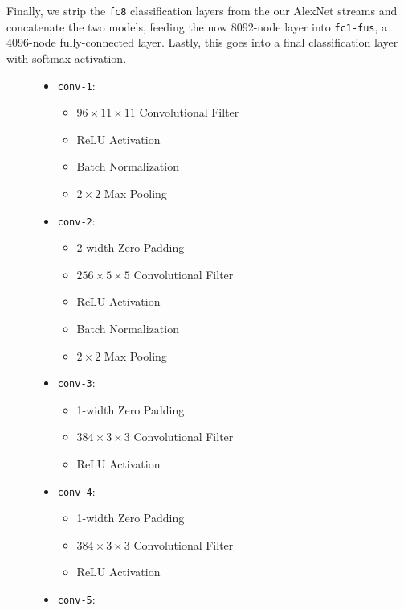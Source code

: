 Finally, we strip the \texttt{fc8} classification layers from the our AlexNet streams and concatenate the two models, feeding the now 8092-node layer into \texttt{fc1-fus}, a 4096-node fully-connected layer. Lastly, this goes into a final classification layer with softmax activation.




\begin{figure}
\begin{mdframed}
\begin{itemize}
    \item \texttt{conv-1}:
    \begin{itemize}
        \item $96 \times 11 \times 11$ Convolutional Filter
        \item ReLU Activation
        \item Batch Normalization
        \item $2 \times 2$ Max Pooling
    \end{itemize}
    \item \texttt{conv-2}:
    \begin{itemize}
        \item 2-width Zero Padding
        \item $256 \times 5 \times 5$ Convolutional Filter
        \item ReLU Activation
        \item Batch Normalization
        \item $2 \times 2$ Max Pooling
    \end{itemize}
    \item \texttt{conv-3}:
    \begin{itemize}
        \item 1-width Zero Padding
        \item $384 \times 3 \times 3$ Convolutional Filter
        \item ReLU Activation
    \end{itemize}
    \item \texttt{conv-4}:
    \begin{itemize}
        \item 1-width Zero Padding
        \item $384 \times 3 \times 3$ Convolutional Filter
        \item ReLU Activation
    \end{itemize}
    \item \texttt{conv-5}:
    \begin{itemize}

\end{itemize}
\end{itemize}
\end{mdframed}
\end{figure}
